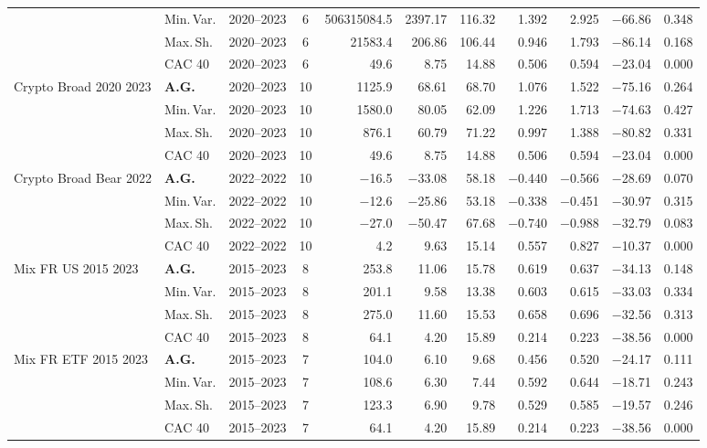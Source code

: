 \begin{longtable}{p{2.6cm} l c c r r r r r r r}
 & Min.\,Var. & 2020--2023 & 6 & 506315084.5 & 2397.17 & 116.32 & 1.392 & 2.925 & $-$66.86 & 0.348 \\
 & Max.\,Sh. & 2020--2023 & 6 & 21583.4 & 206.86 & 106.44 & 0.946 & 1.793 & $-$86.14 & 0.168 \\
 & CAC 40 & 2020--2023 & 6 & 49.6 & 8.75 & 14.88 & 0.506 & 0.594 & $-$23.04 & 0.000 \\
\midrule
Crypto Broad 2020 2023 & \textbf{A.G.} & 2020--2023 & 10 & 1125.9 & 68.61 & 68.70 & 1.076 & 1.522 & $-$75.16 & 0.264 \\
 & Min.\,Var. & 2020--2023 & 10 & 1580.0 & 80.05 & 62.09 & 1.226 & 1.713 & $-$74.63 & 0.427 \\
 & Max.\,Sh. & 2020--2023 & 10 & 876.1 & 60.79 & 71.22 & 0.997 & 1.388 & $-$80.82 & 0.331 \\
 & CAC 40 & 2020--2023 & 10 & 49.6 & 8.75 & 14.88 & 0.506 & 0.594 & $-$23.04 & 0.000 \\
\midrule
Crypto Broad Bear 2022 & \textbf{A.G.} & 2022--2022 & 10 & $-$16.5 & $-$33.08 & 58.18 & $-$0.440 & $-$0.566 & $-$28.69 & 0.070 \\
 & Min.\,Var. & 2022--2022 & 10 & $-$12.6 & $-$25.86 & 53.18 & $-$0.338 & $-$0.451 & $-$30.97 & 0.315 \\
 & Max.\,Sh. & 2022--2022 & 10 & $-$27.0 & $-$50.47 & 67.68 & $-$0.740 & $-$0.988 & $-$32.79 & 0.083 \\
 & CAC 40 & 2022--2022 & 10 & 4.2 & 9.63 & 15.14 & 0.557 & 0.827 & $-$10.37 & 0.000 \\
\midrule
Mix FR US 2015 2023 & \textbf{A.G.} & 2015--2023 & 8 & 253.8 & 11.06 & 15.78 & 0.619 & 0.637 & $-$34.13 & 0.148 \\
 & Min.\,Var. & 2015--2023 & 8 & 201.1 & 9.58 & 13.38 & 0.603 & 0.615 & $-$33.03 & 0.334 \\
 & Max.\,Sh. & 2015--2023 & 8 & 275.0 & 11.60 & 15.53 & 0.658 & 0.696 & $-$32.56 & 0.313 \\
 & CAC 40 & 2015--2023 & 8 & 64.1 & 4.20 & 15.89 & 0.214 & 0.223 & $-$38.56 & 0.000 \\
\midrule
Mix FR ETF 2015 2023 & \textbf{A.G.} & 2015--2023 & 7 & 104.0 & 6.10 & 9.68 & 0.456 & 0.520 & $-$24.17 & 0.111 \\
 & Min.\,Var. & 2015--2023 & 7 & 108.6 & 6.30 & 7.44 & 0.592 & 0.644 & $-$18.71 & 0.243 \\
 & Max.\,Sh. & 2015--2023 & 7 & 123.3 & 6.90 & 9.78 & 0.529 & 0.585 & $-$19.57 & 0.246 \\
 & CAC 40 & 2015--2023 & 7 & 64.1 & 4.20 & 15.89 & 0.214 & 0.223 & $-$38.56 & 0.000 \\

\end{longtable}
